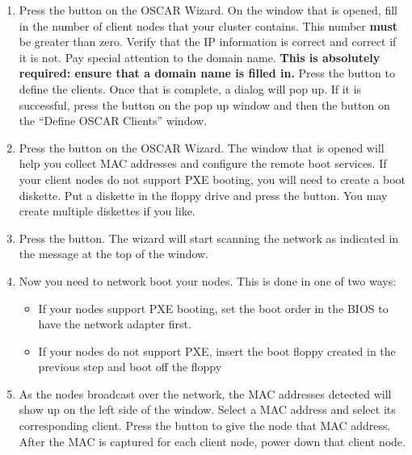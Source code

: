 \begin {enumerate}
  
\item Press the  button on the OSCAR
  Wizard.  On the window that is opened, fill in the number of client
  nodes that your cluster contains.  This number {\bf must} be greater
  than zero.  Verify that the IP information is correct and correct if
  it is not.  Pay special attention to the domain name. {\bf This is
    absolutely required: ensure that a domain name is filled in.}
  Press the  button to define the clients. Once that
  is complete, a dialog will pop up.  If it is successful, press the
   button on the pop up window and then the
   button on the ``Define OSCAR Clients'' window.

  
\item Press the  button on the OSCAR Wizard.
  The window that is opened will help you collect MAC addresses and
  configure the remote boot services. If your client nodes do not
  support PXE booting, you will need to create a boot diskette. Put a
  diskette in the floppy drive and press the  button. You may create multiple diskettes if you like.


\item Press the  button. The wizard will
  start scanning the network as indicated in the message at the top of
  the window.

  
\item Now you need to network boot your nodes. This is done in one of
  two ways:

  \begin{itemize}
  \item If your nodes support PXE booting, set the boot order in the
    BIOS to have the network adapter first.
  \item If your nodes do not support PXE, insert the boot floppy
    created in the previous step and boot off the floppy
  \end{itemize}
        
  
\item As the nodes broadcast over the network, the MAC addresses
  detected will show up on the left side of the window. Select a MAC
  address and select its corresponding client. Press the
   button to give the node that MAC
  address.  After the MAC is captured for each client node, power down
  that client node.


\end{enumerate}
